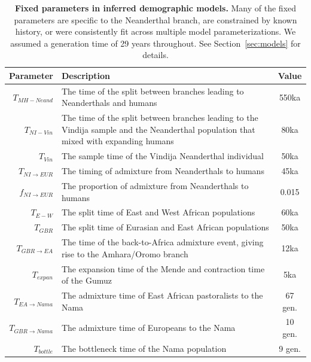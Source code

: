 \documentclass[]{article}
\begin{document}
\begin{table}[ht]
    \caption{
        \label{tab:fixed-params}
        \textbf{Fixed parameters in inferred demographic models.}
        Many of the fixed parameters are specific to the Neanderthal branch, are
        constrained by known history, or were consistently fit across multiple
        model parameterizations. We assumed a generation time of 29 years throughout.
        See Section~\ref{sec:models} for details.
    }
    \centering
    \begin{tabular}[t]{rP{8cm}c}
        \toprule
        Parameter & Description & Value \\
        \midrule
        $T_{MH-Neand}$ & The time of the split between branches leading to Neanderthals and humans & 550ka \\
        $T_{NI-Vin}$ & The time of the split between branches leading to the Vindija sample and the Neanderthal population that mixed with expanding humans & 80ka \\
        $T_{Vin}$ & The sample time of the Vindija Neanderthal individual & 50ka \\
        $T_{NI\rightarrow EUR}$ & The timing of admixture from Neanderthals to humans & 45ka \\
        $f_{NI\rightarrow EUR}$ & The proportion of admixture from Neanderthals to humans & 0.015 \\
        $T_{E-W}$ & The split time of East and West African populations & 60ka \\
        $T_{GBR}$ & The split time of Eurasian and East African populations & 50ka \\
        $T_{GBR\rightarrow EA}$ & The time of the back-to-Africa admixture event, giving rise to the Amhara/Oromo branch & 12ka \\
        $T_{expan}$ & The expansion time of the Mende and contraction time of the Gumuz & 5ka \\
        $T_{EA\rightarrow Nama}$ & The admixture time of East African pastoralists to the Nama & 67 gen. \\
        $T_{GBR\rightarrow Nama}$ & The admixture time of Europeans to the Nama & 10 gen. \\
        $T_{bottle}$ & The bottleneck time of the Nama population & 9 gen. \\
        \bottomrule
    \end{tabular}
\end{table}
\end{document}

